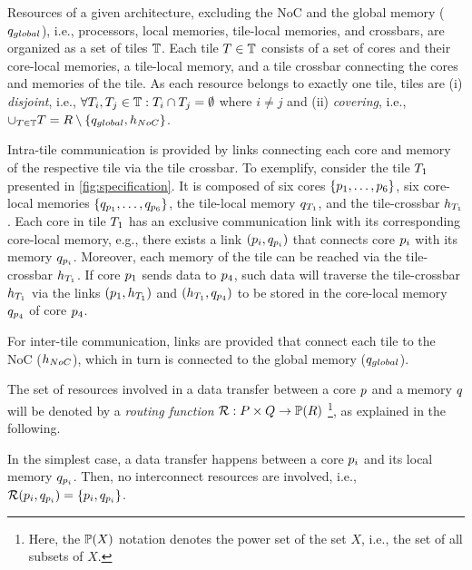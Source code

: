 \par
Resources of a given architecture, excluding the \ac{NoC} and the global memory ($q_{global}$), i.e., processors, local memories, tile-local memories, and crossbars, are organized as a set of tiles $\mathbb{T}$.
Each tile $T \in \mathbb{T}$ consists of a set of cores and their core-local memories, a tile-local memory, and a tile crossbar connecting the cores and memories of the tile.
As each resource belongs to exactly one tile, tiles are (i) \emph{disjoint}, i.e., $\forall T_i, T_j \in \mathbb{T} : T_i \cap T_j = \emptyset$ where $i \neq j$ and (ii) \emph{covering}, i.e., $\cup_{T \in \mathbb{T}} T = R \setminus \{ q_{global}, h_{NoC} \}$.
\par
Intra-tile communication is provided by links connecting each core and memory of the respective tile via the tile crossbar.
To exemplify, consider the tile $T_1$ presented in \cref{fig:specification}.
It is composed of six cores $\{p_1,\ldots,p_6\}$, six core-local memories $\{q_{p_1},\ldots,q_{p_6}\}$, the tile-local memory $q_{T_1}$, and the tile-crossbar ${h_{T_{1}}}$.
Each core in tile $T_1$ has an exclusive communication link with its corresponding core-local memory, e.g., there exists a link $(p_i,q_{p_i})$ that connects core $p_i$ with its memory $q_{p_i}$.
Moreover, each memory of the tile can be reached via the tile-crossbar ${h_{T_{1}}}$.
If core $p_1$ sends data to $p_4$, such data will traverse the tile-crossbar ${h_{T_{1}}}$ via the links $(p_1,{h_{T_{1}}})$ and $({h_{T_{1}}},q_{p_4})$ to be stored in the core-local memory $q_{p_4}$ of core $p_4$.
\par
For inter-tile communication, links are provided that connect each tile to the \ac{NoC} ($h_{NoC}$), which in turn is connected to the global memory ($q_{global}$).
\par
The set of resources involved in a data transfer between a core $p$ and a memory $q$ will be denoted by a \emph{routing function} $\mathcal{R}: P \times Q \rightarrow \mathbb{P}(R)$%
\footnote{Here, the $\mathbb{P}(X)$ notation denotes the power set of the set $X$, i.e., the set of all subsets of $X$.}, as explained in the following.
\par
In the simplest case, a data transfer happens between a core $p_i$ and its local memory $q_{p_i}$.
Then, no interconnect resources are involved, i.e., $\mathcal{R}(p_i, q_{p_i}) = \{p_i, q_{p_i}\}$.
